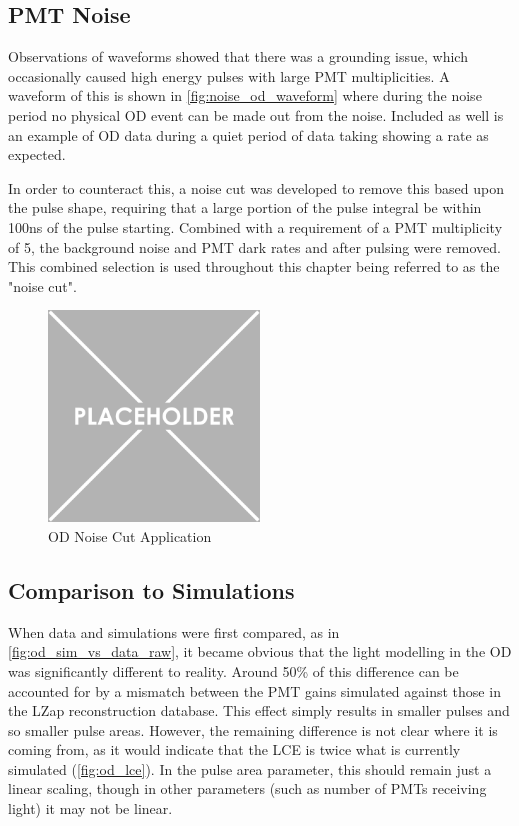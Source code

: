 \subsection{PMT Noise}
\par
Observations of waveforms showed that there was a grounding issue, which occasionally caused high energy pulses with large PMT multiplicities.
A waveform of this is shown in \autoref{fig:noise_od_waveform} where during the noise period no physical OD event can be made out from the noise.
Included as well is an example of OD data during a quiet period of data taking showing a rate as expected.



\par
In order to counteract this, a noise cut was developed to remove this based upon the pulse shape, requiring that a large portion of the pulse integral be within 100ns of the pulse starting.
Combined with a requirement of a PMT multiplicity of 5, the background noise and PMT dark rates and after pulsing were removed.
This combined selection is used throughout this chapter being referred to as the "noise cut".

\begin{figure}
    \centering
    \includegraphics[width=0.5\textwidth]{Figures/Placeholder.png}
    \caption{OD Noise Cut Application}
    \label{fig:od_noise_cut}
\end{figure}

\subsection{Comparison to Simulations}
\par

When data and simulations were first compared, as in \autoref{fig:od_sim_vs_data_raw}, it became obvious that the light modelling in the OD was significantly different to reality.
Around 50\% of this difference can be accounted for by a mismatch between the PMT gains simulated against those in the LZap reconstruction database.
This effect simply results in smaller pulses and so smaller pulse areas.
However, the remaining difference is not clear where it is coming from, as it would indicate that the LCE is twice what is currently simulated (\autoref{fig:od_lce}).
In the pulse area parameter, this should remain just a linear scaling, though in other parameters (such as number of PMTs receiving light) it may not be linear.


